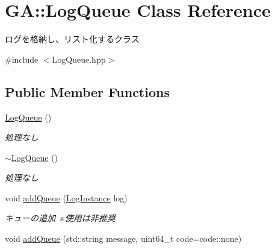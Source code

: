 \hypertarget{class_g_a_1_1_log_queue}{}\section{GA\+::Log\+Queue Class Reference}
\label{class_g_a_1_1_log_queue}


ログを格納し、リスト化するクラス  




{\ttfamily \#include $<$Log\+Queue.\+hpp$>$}

\subsection*{Public Member Functions}
\begin{DoxyCompactItemize}
\item 
\mbox{\label{class_g_a_1_1_log_queue_ad4979dd25639f650a9428348b58dd905}} 
\mbox{\hyperlink{class_g_a_1_1_log_queue_ad4979dd25639f650a9428348b58dd905}{Log\+Queue}} ()
\begin{DoxyCompactList}\small\item\em 処理なし \end{DoxyCompactList}\item 
\mbox{\label{class_g_a_1_1_log_queue_a9c28fe6efd218c251a2f24c7128c07b8}} 
\mbox{\hyperlink{class_g_a_1_1_log_queue_a9c28fe6efd218c251a2f24c7128c07b8}{$\sim$\+Log\+Queue}} ()
\begin{DoxyCompactList}\small\item\em 処理なし \end{DoxyCompactList}\item 
\mbox{\label{class_g_a_1_1_log_queue_a41e2a1bfa8a944dda376eedb32894f1a}} 
void \mbox{\hyperlink{class_g_a_1_1_log_queue_a41e2a1bfa8a944dda376eedb32894f1a}{add\+Queue}} (\mbox{\hyperlink{class_g_a_1_1_log_instance}{Log\+Instance}} log)
\begin{DoxyCompactList}\small\item\em キューの追加 ※使用は非推奨 \end{DoxyCompactList}\item 
\mbox{\label{class_g_a_1_1_log_queue_a4a2330d09a59be8e8af5c9185fd7557e}} 
void \mbox{\hyperlink{class_g_a_1_1_log_queue_a4a2330d09a59be8e8af5c9185fd7557e}{add\+Queue}} (std\+::string message, uint64\+\_\+t code=code\+::none)

\end{DoxyCompactItemize}
